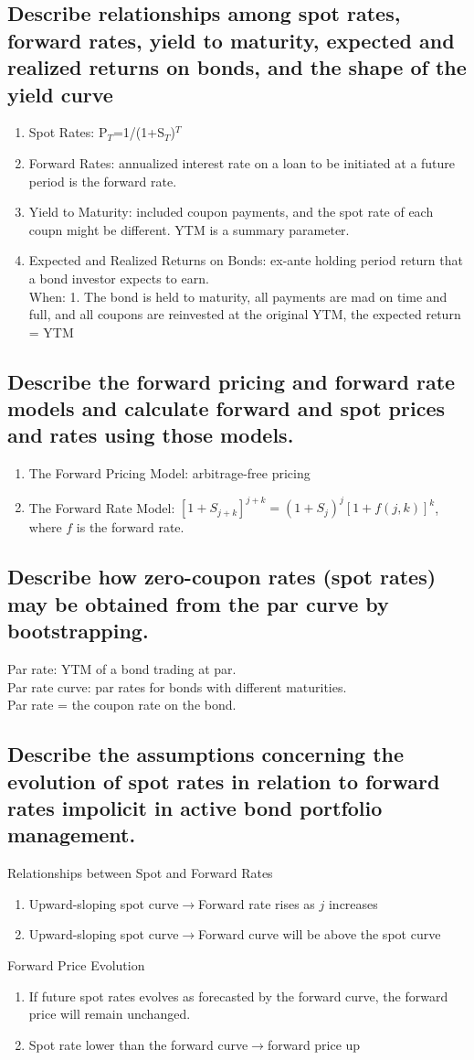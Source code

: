 \documentclass{article}
\newcommand{\be}{\begin{enumerate}}
\newcommand{\ee}{\end{enumerate}}
\newcommand{\ra}{$\rightarrow$}
\begin{document}
\subsection{Describe relationships among spot rates, forward rates, yield to maturity,
expected and realized returns on bonds, and the shape of the yield curve}
\be
    \item Spot Rates: P$_T$=1/(1+S$_T$)$^T$
    \item Forward Rates: annualized interest rate on a loan to be initiated
        at a future period is the forward rate.
    \item Yield to Maturity: included coupon payments, and the spot rate of each
        coupn might be different. YTM is a summary parameter.
    \item Expected and Realized Returns on Bonds: ex-ante holding period return that a 
        bond investor expects to earn.
        \\When: 1. The bond is held to maturity, all payments are mad on time and full, 
        and all coupons are reinvested at the original YTM, the expected return =
        YTM
\ee
\subsection{Describe the forward pricing and forward rate models and calculate forward
and spot prices and rates using those models.}
\be
    \item The Forward Pricing Model: arbitrage-free pricing 
    \item The Forward Rate Model: $[1+S_{j+k}]^{j+k}=(1+S_j)^j[1+f(j,k)]^k$, 
        where $f$ is the forward rate.
\ee
\subsection{Describe how zero-coupon rates (spot rates) may be obtained from the par
curve by bootstrapping.}
Par rate: YTM of a bond trading at par.
\\ Par rate curve: par rates for bonds with different maturities.
\\ Par rate = the coupon rate on the bond.
\subsection{Describe the assumptions concerning the evolution of spot rates in relation 
to forward rates impolicit in active bond portfolio management.}
Relationships between Spot and Forward Rates
\be
    \item Upward-sloping spot curve\ra Forward rate rises as $j$ increases
    \item Upward-sloping spot curve\ra Forward curve will be above the spot curve
\ee
Forward Price Evolution
\be
    \item If future spot rates evolves as forecasted by the forward curve, the forward
        price will remain unchanged.
    \item Spot rate lower than the forward curve\ra forward price up
\ee
\end{document}
